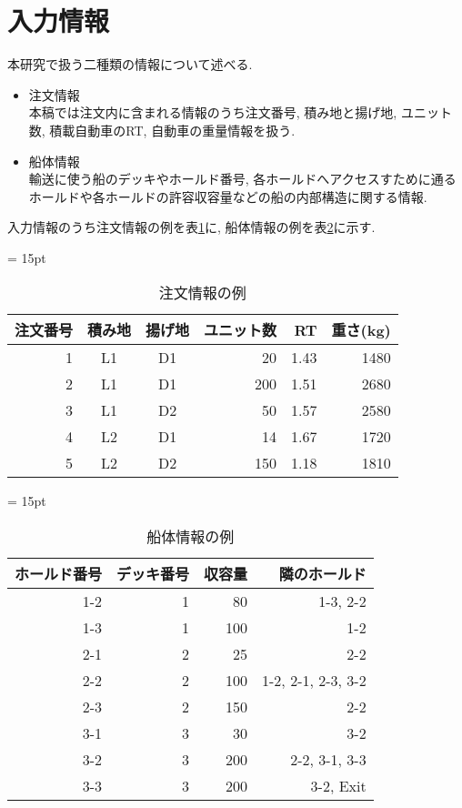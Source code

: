 \section{入力情報}
本研究で扱う二種類の情報について述べる.
\begin{itemize}

\item 注文情報 \\
本稿では注文内に含まれる情報のうち注文番号, 積み地と揚げ地, ユニット数, 積載自動車のRT, 自動車の重量情報を扱う.

\item 船体情報 \\
輸送に使う船のデッキやホールド番号, 各ホールドへアクセスすために通るホールドや各ホールドの許容収容量などの船の内部構造に関する情報.

\end{itemize}

入力情報のうち注文情報の例を表\ref{table21}に, 船体情報の例を表\ref{table22}に示す. \\

\begin{table}[htbp]
\tabcolsep = 15pt
\renewcommand{\arraystretch}{0.8}
\caption{注文情報の例}
\label{table21}
\begin{center}
\begin{tabular}{rccrrr} \hline
注文番号 & 積み地 & 揚げ地 & ユニット数 & RT & 重さ(kg) \\ \hline
1 & L1 & D1 & 20 & 1.43 & 1480 \\
2 & L1 & D1 & 200 & 1.51 & 2680 \\
3 & L1 & D2 & 50 & 1.57 & 2580 \\
4 & L2 & D1 & 14 & 1.67 & 1720 \\
5 & L2 & D2 & 150 & 1.18 & 1810 \\
\hline
\end{tabular}
\end{center}
\end{table}

\begin{table}[htbp]
\centering
\tabcolsep = 15pt
\renewcommand{\arraystretch}{0.8}
\caption{船体情報の例}
\label{table22}
\begin{center}
\begin{tabular}{rrrr} \hline
ホールド番号 & デッキ番号 & 収容量 & 隣のホールド \\ \hline
1-2 & 1 & 80 & 1-3, 2-2 \\
1-3 & 1 & 100 & 1-2 \\
2-1 & 2 & 25 & 2-2 \\
2-2 & 2 & 100 & 1-2, 2-1, 2-3, 3-2 \\
2-3 & 2 & 150 & 2-2 \\
3-1 & 3 & 30 & 3-2 \\
3-2 & 3 & 200 & 2-2, 3-1, 3-3 \\
3-3 & 3 & 200 & 3-2, Exit \\
\hline
\end{tabular}
\end{center}
\end{table}

